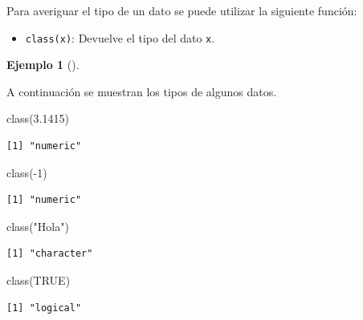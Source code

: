 \documentclass[
  spanish,
  a4paper,
]{scrreport}
\newenvironment{Shaded}{\begin{snugshade}}{\end{snugshade}}
\newcommand{\ConstantTok}[1]{\textcolor[rgb]{0.56,0.35,0.01}{#1}}
\newcommand{\DecValTok}[1]{\textcolor[rgb]{0.68,0.00,0.00}{#1}}
\newcommand{\FloatTok}[1]{\textcolor[rgb]{0.68,0.00,0.00}{#1}}
\newcommand{\FunctionTok}[1]{\textcolor[rgb]{0.28,0.35,0.67}{#1}}
\newcommand{\NormalTok}[1]{\textcolor[rgb]{0.00,0.23,0.31}{#1}}
\newcommand{\SpecialCharTok}[1]{\textcolor[rgb]{0.37,0.37,0.37}{#1}}
\newcommand{\StringTok}[1]{\textcolor[rgb]{0.13,0.47,0.30}{#1}}
\providecommand{\tightlist}{%
  \setlength{\itemsep}{0pt}\setlength{\parskip}{0pt}}
\theoremstyle{definition}
\theoremstyle{definition}
\newtheorem{example}{Ejemplo}[chapter]
\theoremstyle{remark}
\begin{document}
Para averiguar el tipo de un dato se puede utilizar la siguiente
función:

\begin{itemize}
\tightlist
\item
  \texttt{class(x)}: Devuelve el tipo del dato \texttt{x}.
\end{itemize}

\begin{example}[]\protect\hypertarget{exm-tipos-datos}{}\label{exm-tipos-datos}

A continuación se muestran los tipos de algunos datos.

\begin{Shaded}
\begin{Highlighting}[]
\FunctionTok{class}\NormalTok{(}\FloatTok{3.1415}\NormalTok{)}
\end{Highlighting}
\end{Shaded}

\begin{verbatim}
[1] "numeric"
\end{verbatim}

\begin{Shaded}
\begin{Highlighting}[]
\FunctionTok{class}\NormalTok{(}\SpecialCharTok{{-}}\DecValTok{1}\NormalTok{)}
\end{Highlighting}
\end{Shaded}

\begin{verbatim}
[1] "numeric"
\end{verbatim}

\begin{Shaded}
\begin{Highlighting}[]
\FunctionTok{class}\NormalTok{(}\StringTok{"Hola"}\NormalTok{)}
\end{Highlighting}
\end{Shaded}

\begin{verbatim}
[1] "character"
\end{verbatim}

\begin{Shaded}
\begin{Highlighting}[]
\FunctionTok{class}\NormalTok{(}\ConstantTok{TRUE}\NormalTok{)}
\end{Highlighting}
\end{Shaded}

\begin{verbatim}
[1] "logical"
\end{verbatim}


\end{example}
\end{document}
